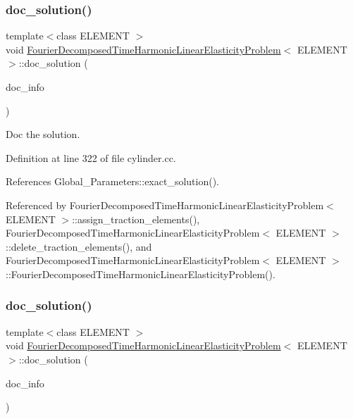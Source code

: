 \subsubsection{\texorpdfstring{doc\+\_\+solution()}{doc\_solution()}\hspace{0.1cm}{\footnotesize\ttfamily [2/3]}}
{\footnotesize\ttfamily template$<$class E\+L\+E\+M\+E\+NT $>$ \\
void \hyperlink{classFourierDecomposedTimeHarmonicLinearElasticityProblem}{Fourier\+Decomposed\+Time\+Harmonic\+Linear\+Elasticity\+Problem}$<$ E\+L\+E\+M\+E\+NT $>$\+::doc\+\_\+solution (\begin{DoxyParamCaption}\item[{Doc\+Info \&}]{doc\+\_\+info }\end{DoxyParamCaption})}



Doc the solution. 



Definition at line 322 of file cylinder.\+cc.



References Global\+\_\+\+Parameters\+::exact\+\_\+solution().



Referenced by Fourier\+Decomposed\+Time\+Harmonic\+Linear\+Elasticity\+Problem$<$ E\+L\+E\+M\+E\+N\+T $>$\+::assign\+\_\+traction\+\_\+elements(), Fourier\+Decomposed\+Time\+Harmonic\+Linear\+Elasticity\+Problem$<$ E\+L\+E\+M\+E\+N\+T $>$\+::delete\+\_\+traction\+\_\+elements(), and Fourier\+Decomposed\+Time\+Harmonic\+Linear\+Elasticity\+Problem$<$ E\+L\+E\+M\+E\+N\+T $>$\+::\+Fourier\+Decomposed\+Time\+Harmonic\+Linear\+Elasticity\+Problem().

\mbox{\label{classFourierDecomposedTimeHarmonicLinearElasticityProblem_af328e5b2260377fa7df04b727ca130bd}} 
\subsubsection{\texorpdfstring{doc\+\_\+solution()}{doc\_solution()}\hspace{0.1cm}{\footnotesize\ttfamily [3/3]}}
{\footnotesize\ttfamily template$<$class E\+L\+E\+M\+E\+NT $>$ \\
void \hyperlink{classFourierDecomposedTimeHarmonicLinearElasticityProblem}{Fourier\+Decomposed\+Time\+Harmonic\+Linear\+Elasticity\+Problem}$<$ E\+L\+E\+M\+E\+NT $>$\+::doc\+\_\+solution (\begin{DoxyParamCaption}\item[{Doc\+Info \&}]{doc\+\_\+info }\end{DoxyParamCaption})}



